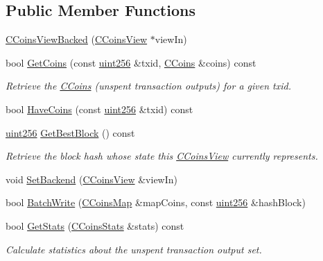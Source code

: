 \subsection*{Public Member Functions}
\begin{DoxyCompactItemize}
\item 
\hyperlink{class_c_coins_view_backed_af86a3b07433e8d84678772411791125e}{C\+Coins\+View\+Backed} (\hyperlink{class_c_coins_view}{C\+Coins\+View} $\ast$view\+In)
\item 
bool \hyperlink{class_c_coins_view_backed_a21b95a9910f94e9b7ebed62a6f329ea0}{Get\+Coins} (const \hyperlink{classuint256}{uint256} \&txid, \hyperlink{class_c_coins}{C\+Coins} \&coins) const 
\begin{DoxyCompactList}\small\item\em Retrieve the \hyperlink{class_c_coins}{C\+Coins} (unspent transaction outputs) for a given txid. \end{DoxyCompactList}\item 
bool \hyperlink{class_c_coins_view_backed_a6a769cf9cc55128dea8e1a2798056e71}{Have\+Coins} (const \hyperlink{classuint256}{uint256} \&txid) const 
\item 
\hyperlink{classuint256}{uint256} \hyperlink{class_c_coins_view_backed_a8465dc4764fd5b01591b824551cbbfab}{Get\+Best\+Block} () const 
\begin{DoxyCompactList}\small\item\em Retrieve the block hash whose state this \hyperlink{class_c_coins_view}{C\+Coins\+View} currently represents. \end{DoxyCompactList}\item 
void \hyperlink{class_c_coins_view_backed_a7eaddfbfd401a95c2fda2a8d8feaaf73}{Set\+Backend} (\hyperlink{class_c_coins_view}{C\+Coins\+View} \&view\+In)
\item 
bool \hyperlink{class_c_coins_view_backed_ace15da3934c9d7a9cb9c7a787f92f764}{Batch\+Write} (\hyperlink{coins_8h_a2886ba2fd0428bae777e1cbcabc02834}{C\+Coins\+Map} \&map\+Coins, const \hyperlink{classuint256}{uint256} \&hash\+Block)
\item 
bool \hyperlink{class_c_coins_view_backed_a368f277ac68652a91ac171f46f02edca}{Get\+Stats} (\hyperlink{struct_c_coins_stats}{C\+Coins\+Stats} \&stats) const 
\begin{DoxyCompactList}\small\item\em Calculate statistics about the unspent transaction output set. \end{DoxyCompactList}\end{DoxyCompactItemize}
